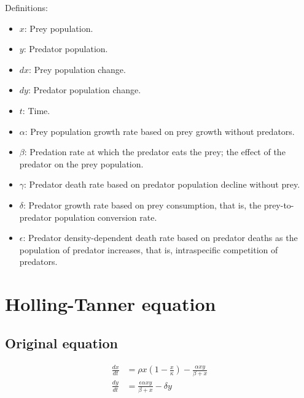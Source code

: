 Definitions:
\begin{itemize}
\item $x$: Prey population.
\item $y$: Predator population.
\item $dx$: Prey population change.
\item $dy$: Predator population change.
\item $t$: Time.
\item $\alpha$: Prey population growth rate based on prey growth without predators.
\item $\beta$: Predation rate at which the predator eats the prey; the effect of the predator on the prey population.
\item $\gamma$: Predator death rate based on predator population decline without prey.
\item $\delta$: Predator growth rate based on prey consumption, that is, the prey-to-predator population conversion rate.
\item $\epsilon$: Predator density-dependent death rate based on predator deaths as the population of predator increases, that is, intraspecific competition of predators.
\end{itemize}

\section{Holling-Tanner equation}
\subsection{Original equation}
\begin{equation*}
\begin{split}
\frac{dx}{dt} &= \rho x \left(1 - \frac{x}{\kappa}\right) - \frac{\alpha xy}{\beta + x} \\
\frac{dy}{dt} &= \frac{\epsilon \alpha xy}{\beta + x} - \delta y
\end{split}
\end{equation*}

